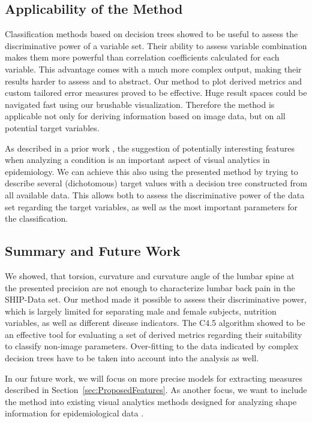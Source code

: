 \documentclass[a4paper,twoside]{style/article}
\begin{document}
\subsection{Applicability of the Method}
Classification methods based on decision trees showed to be useful to assess the discriminative power of a variable set.
Their ability to assess variable combination makes them more powerful than correlation coefficients calculated for each variable.
This advantage comes with a much more complex output, making their results harder to assess and to abstract.
Our method to plot derived metrics and custom tailored error measures proved to be effective.
Huge result spaces could be navigated fast using our brushable visualization.
Therefore the method is applicable not only for deriving information based on image data, but on all potential target variables.

As described in a prior work \cite{Klemm2014}, the suggestion of potentially interesting features when analyzing a condition is an important aspect of visual analytics in epidemiology.
We can achieve this also using the presented method by trying to describe several (dichotomous) target values with a decision tree constructed from all available data.
This allows both to assess the discriminative power of the data set regarding the target variables, as well as the most important parameters for the classification.

\subsection{Summary and Future Work}
\noindent We showed, that torsion, curvature and curvature angle of the lumbar spine at the presented precision are not enough to characterize lumbar back pain in the SHIP-Data set.
Our method made it possible to assess their discriminative power, which is largely limited for separating male and female subjects, nutrition variables, as well as different disease indicators.
The C4.5 algorithm showed to be an effective tool for evaluating a set of derived metrics regarding their suitability to classify non-image parameters.
Over-fitting to the data indicated by complex decision trees have to be taken into account into the analysis as well.

In our future work, we will focus on more precise models for extracting measures described in Section~\ref{sec:ProposedFeatures}.
As another focus, we want to include the method into existing visual analytics methods designed for analyzing shape information for epidemiological data \cite{Klemm2014}.
\end{document}
